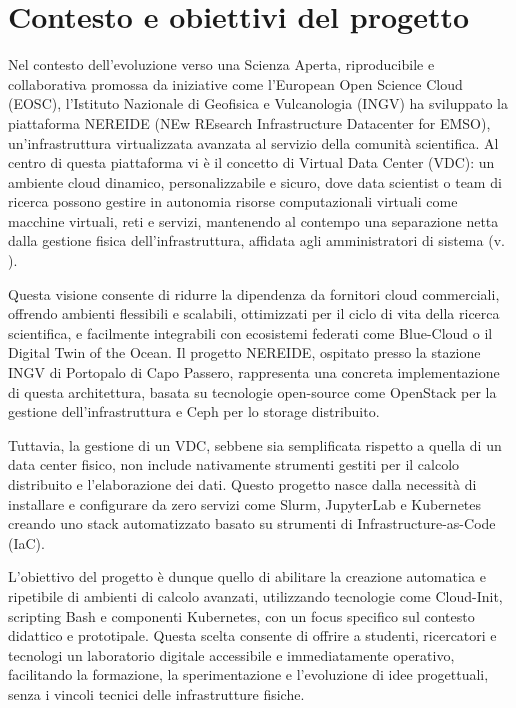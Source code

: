 \documentclass[12pt,a4paper,openright,twoside]{book}
\begin{document}
\section{Contesto e obiettivi del progetto}
Nel contesto dell'evoluzione verso una Scienza Aperta, riproducibile e collaborativa promossa da iniziative come l'European Open Science Cloud (EOSC),
l'Istituto Nazionale di Geofisica e Vulcanologia (INGV) ha sviluppato la piattaforma NEREIDE (NEw REsearch Infrastructure Datacenter for EMSO),
un'infrastruttura virtualizzata avanzata al servizio della comunità scientifica.
Al centro di questa piattaforma vi è il concetto di Virtual Data Center (VDC): 
un ambiente cloud dinamico, personalizzabile e sicuro, dove data scientist o team di ricerca possono gestire in autonomia risorse computazionali virtuali come
macchine virtuali, reti e servizi, mantenendo al contempo una separazione netta dalla gestione fisica dell'infrastruttura, affidata agli amministratori di sistema (v. ).

Questa visione consente di ridurre la dipendenza da fornitori cloud commerciali, offrendo ambienti flessibili e scalabili, ottimizzati per il ciclo di vita della ricerca scientifica,
e facilmente integrabili con ecosistemi federati come Blue-Cloud o il Digital Twin of the Ocean.
Il progetto NEREIDE, ospitato presso la stazione INGV di Portopalo di Capo Passero, rappresenta una concreta implementazione di questa architettura,
basata su tecnologie open-source come OpenStack per la gestione dell'infrastruttura e Ceph per lo storage distribuito\cite{cacciaguerra2024vdc}.

Tuttavia, la gestione di un VDC, sebbene sia semplificata rispetto a quella di un data center fisico, non include nativamente strumenti gestiti per il calcolo distribuito
e l'elaborazione dei dati. Questo progetto nasce dalla necessità di installare e configurare da zero servizi come Slurm, JupyterLab e Kubernetes creando uno stack automatizzato
basato su strumenti di Infrastructure-as-Code (IaC).

L'obiettivo del progetto è dunque quello di abilitare la creazione automatica e ripetibile di ambienti di calcolo avanzati, utilizzando tecnologie come Cloud-Init,
scripting Bash e componenti Kubernetes, con un focus specifico sul contesto didattico e prototipale. 
Questa scelta consente di offrire a studenti, ricercatori e tecnologi un laboratorio digitale accessibile e immediatamente operativo, facilitando la formazione,
la sperimentazione e l'evoluzione di idee progettuali, senza i vincoli tecnici delle infrastrutture fisiche.
\end{document}

